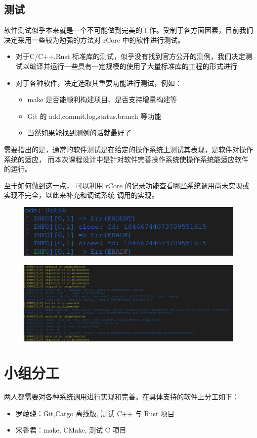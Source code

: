 \documentclass{article}
\begin{document}
    \subsection{测试}

    软件测试似乎本来就是一个不可能做到完美的工作。受制于各方面因素，目前我们决定采用一些较为勉强的方法对 rCore 中的软件进行测试。

    \begin{itemize}
        \item 对于C/C++,Rust 标准库的测试，似乎没有找到官方公开的测例，我们决定测试以编译并运行一些具有一定规模的使用了大量标准库的工程的形式进行
        \item 对于各种软件，决定选取其重要功能进行测试，例如：
        \begin{itemize}
            \item make 是否能顺利构建项目、是否支持增量构建等
            \item Git 的 add,commit,log,status,branch 等功能
            \item 当然如果能找到测例的话就最好了
        \end{itemize}
    \end{itemize}

    需要指出的是，通常的软件测试是在给定的操作系统上测试其表现，是软件对操作系统的适应，
    而本次课程设计中是针对软件完善操作系统使操作系统能适应软件的运行。
    
    \newpage
    至于如何做到这一点，
    可以利用 rCore 的记录功能查看哪些系统调用尚未实现或实现不完全，以此来补充和调试系统
    调用的实现。

    \begin{figure}[H]
        \centering
        \includegraphics[width=\linewidth]{assets/syscall0.png}
    \end{figure}
    \begin{figure}[H]
        \centering
        \includegraphics[width=\linewidth]{assets/syscall1.png}
    \end{figure}


    \section{小组分工}
    两人都需要对各种系统调用进行实现和完善。在具体支持的软件上分工如下：
    \begin{itemize}
        \item 罗崚骁：Git,Cargo 离线版, 测试 C++ 与 Rust 项目
        \item 宋香君：make, CMake, 测试 C 项目
    \end{itemize}
\end{document}
